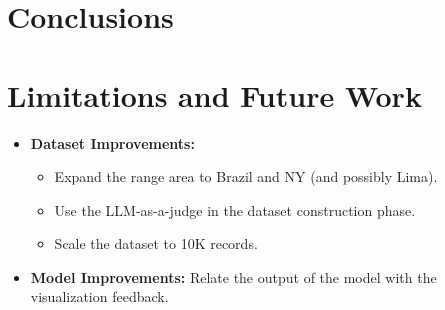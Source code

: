 
\section{Conclusions}

\section{Limitations and Future Work}

\begin{itemize}
    \item \textbf{Dataset Improvements:} 
    \begin{itemize}
        \item Expand the range area to Brazil and NY (and possibly Lima). 
        \item Use the LLM-as-a-judge in the dataset construction phase.
        \item Scale the dataset to 10K records.
    \end{itemize}
    \item \textbf{Model Improvements:} Relate the output of the model with the visualization feedback.
\end{itemize}
